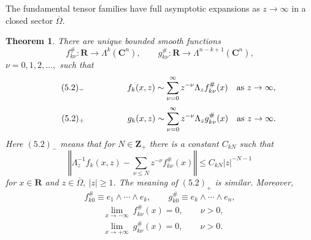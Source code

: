\documentclass{surv-l}
\theoremstyle{plain}
\newtheorem{theorem}{Theorem}[section]
\theoremstyle{definition}
\numberwithin{equation}{chapter}
\begin{document}
 The fundamental tensor families have full asymptotic expansions as $z \rightarrow\infty$ in a closed sector $\overline{\Omega}$.
\setcounter{theorem}{0}
\begin{theorem}\label{chap01:thm5.1}
There are unique bounded smooth functions
\begin{equation*}
f_{k\nu}^{\#}:\mathbf{R}\rightarrow\Lambda^{k}(\mathbf{C}^{n}),\qquad g_{k\nu}^{\#}:\mathbf{R}\rightarrow\Lambda^{n-k+1}(\mathbf{C}^{n}),
\end{equation*}
$\nu=0,1,2,\ldots,$ such that
\begin{equation*}
\tag*{$(5.2)_{-}$} \qquad \qquad \quad f_{k}(x, z)\displaystyle \sim\sum_{\nu=0}^{\infty}z^{-\nu}\Lambda_{z}f_{k\nu}^{\#}(x)\quad \mathrm{as}\ z\rightarrow\infty,
\end{equation*}
\begin{equation*}
\tag*{$(5.2)_{+}$} \qquad \qquad \quad g_{k}(x, z)\displaystyle \sim\sum_{\nu=0}^{\infty}z^{-\nu}\Lambda_{z}g_{k\nu}^{\#}(x)\quad \mathrm{as}\ z\rightarrow\infty.
\end{equation*}
Here $(5.2)_{-}$ means that for $N\in \mathbf{Z}_{+}$ there is a constant $C_{kN}$ such that
\renewcommand{\theequation}{\thesection.\arabic{equation}}
\setcounter{equation}{2}
\begin{equation}\label{eq5.3}
\left\Vert\Lambda_{z}^{-1}f_{k}(x,z)-\sum_{\nu\leq N}z^{-\nu}f_{k\nu}^{\#}(x)\right\Vert\leq C_{kN}|z|^{-N-1}
\end{equation}
for $x\in \mathbf{R}$ and $z\in\overline{\Omega},\ |z|\geq 1$. The meaning of $(5.2)_{+}$ is similar. Moreover,
\begin{equation}\label{eq5.4}
f_{k0}^{\#}\equiv e_{1}\wedge\cdots \wedge e_{k},\qquad  g_{k0}^{\#}\equiv e_{k}\wedge\cdots \wedge e_{n},
\end{equation}
\begin{align}\label{eq5.5}
&\lim_{x\rightarrow-\infty}\ f_{k\nu}^{\#}(x)=0,\qquad \nu >0,\\ \nonumber
&\lim_{x\rightarrow+\infty}\ g_{k\nu}^{\#}(x)=0,\qquad \nu >0.
\end{align}
\end{theorem}
\end{document}
